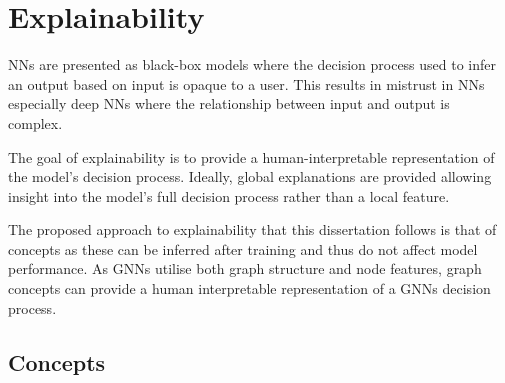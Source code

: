 

\section{Explainability}




NNs are presented as black-box models where the decision process used to infer an output based on input is opaque to a user.
This results in mistrust in NNs especially deep NNs where the relationship between input and output is complex.~\cite{haibe2020transparency,wang2022revise}

The goal of explainability is to provide a human-interpretable representation of the model's decision process.
Ideally, global explanations are provided allowing insight into the model's full decision process rather than a local feature.

The proposed approach to explainability that this dissertation follows is that of concepts as these can be inferred after training and thus do not affect model performance.
As GNNs utilise both graph structure and node features, graph concepts can provide a human interpretable representation of a GNNs decision process.

\subsection{Concepts}



